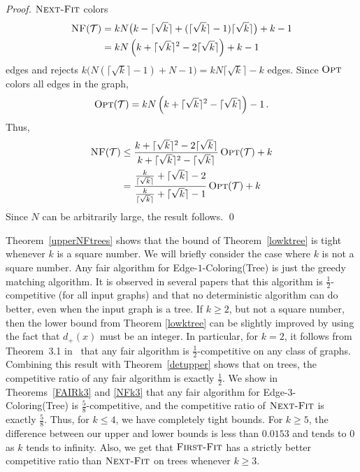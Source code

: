\documentclass[smallextended]{svjour3}
\def\ceilk{\lceil\sqrt{k}\rceil}
\def\dc{d_{+}}
\newcommand{\NF}{\ensuremath{\operatorname{\textsc{Next-Fit}}}\xspace}
\newcommand{\FF}{\ensuremath{\operatorname{\textsc{First-Fit}}}\xspace}
\newcommand{\nf}{\ensuremath{\operatorname{\textsc{NF}}}\xspace}
\newcommand{\OPT}{\ensuremath{\operatorname{\textsc{Opt}}}\xspace}
\begin{document}
\begin{proof}
\NF colors
\begin{align*}
\nf(\mathcal{T}) &= kN\big(k-\ceilk+(\ceilk-1)\ceilk\big)+k-1\\
& = kN\left(k+\ceilk^2-2\ceilk \right)+k-1
\end{align*}
 edges and rejects $k\big(N(\ceilk-1)+N-1\big) = kN\ceilk-k$ edges. 
Since \OPT colors all edges in the graph, 
 $$\OPT(\mathcal{T})=kN\left(k+\ceilk^2-\ceilk \right)-1\,.$$ 
Thus, 
\begin{align*}
\nf(\mathcal{T})&\leq\frac{k+\ceilk^2 -2\ceilk}{k+\ceilk^2-\ceilk}\OPT(\mathcal{T})+k\\
&= \frac{\frac{k}{\lceil\sqrt{k}\rceil}+\lceil\sqrt{k}\rceil-2}{\frac{k}{\lceil\sqrt{k}\rceil}+\lceil\sqrt{k}\rceil-1}\OPT(\mathcal{T})+k
\end{align*} 
Since $N$ can be arbitrarily large, the result follows.
\qed\end{proof}

Theorem~\ref{upperNFtrees} shows that the bound of Theorem~\ref{lowktree} is tight whenever $k$ is a square number. We will briefly consider the case where $k$ is not a square
number. Any fair algorithm for {\sc Edge-$1$-Coloring(Tree)} is just
the greedy matching algorithm. It is observed in several papers that this algorithm is $\frac12$-competitive (for all input graphs) and that no deterministic algorithm can do better, even when the input graph is a tree.  If $k\geq 2$, but not a square number, then the lower bound from Theorem \ref{lowktree} can be slightly improved by using the fact that $\dc(x)$ must be an integer. In particular, for $k=2$, it follows from Theorem~3.1 in~\cite{kedge} that any fair algorithm is $\frac12$-competitive on any class of graphs. Combining this result with Theorem~\ref{detupper} shows that on trees, the competitive ratio of any fair algorithm is exactly $\frac12$.
We show in Theorems~\ref{FAIRk3} and \ref{NFk3} that any fair algorithm for {\sc Edge-$3$-Coloring(Tree)} is $\frac58$-competitive, and the competitive ratio of \NF is exactly $\frac58$.
Thus, for $k \leq 4$, we have completely tight bounds.
For $k \geq 5$, the difference between our upper and lower bounds is less than $0.0153$ and tends to $0$ as $k$ tends to infinity. Also, we get that \FF has a strictly better competitive ratio than \NF on trees whenever $k\geq 3$.
\end{document}
